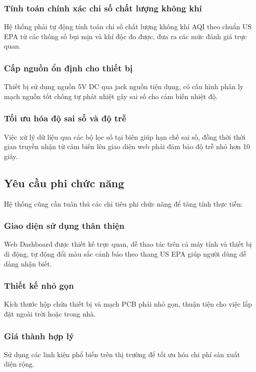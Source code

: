 \documentclass[12pt,a4paper]{article}
\begin{document}
\subsubsection{Tính toán chính xác chỉ số chất lượng không khí}
Hệ thống phải tự động tính toán chỉ số chất lượng không khí AQI theo chuẩn US EPA từ các thông số bụi mịn và khí độc đo được, đưa ra các mức đánh giá trực quan.

\subsubsection{Cấp nguồn ổn định cho thiết bị}
Thiết bị sử dụng nguồn 5V DC qua jack nguồn tiện dụng, có cấu hình phân ly mạch nguồn tốt chống tự phát nhiệt gây sai số cho cảm biến nhiệt độ.

\subsubsection{Tối ưu hóa độ sai số và độ trễ}
Việc xử lý dữ liệu qua các bộ lọc số tại biên giúp hạn chế sai số, đồng thời thời gian truyền nhận từ cảm biến lên giao diện web phải đảm bảo độ trễ nhỏ hơn 10 giây.



\subsection{Yêu cầu phi chức năng}
Hệ thống cũng cần tuân thủ các chỉ tiêu phi chức năng để tăng tính thực tiễn:

\subsubsection{Giao diện sử dụng thân thiện}
Web Dashboard được thiết kế trực quan, dễ thao tác trên cả máy tính và thiết bị di động, tự động đổi màu sắc cảnh báo theo thang US EPA giúp người dùng dễ dàng nhận biết.

\subsubsection{Thiết kế nhỏ gọn}
Kích thước hộp chứa thiết bị và mạch PCB phải nhỏ gọn, thuận tiện cho việc lắp đặt ngoài trời hoặc trong nhà.

\subsubsection{Giá thành hợp lý}
Sử dụng các linh kiện phổ biến trên thị trường để tối ưu hóa chi phí sản xuất diện rộng.
\end{document}
